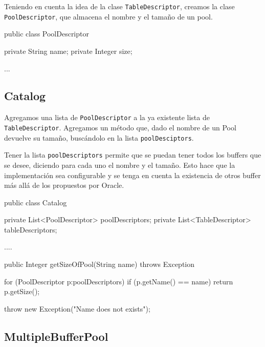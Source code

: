 Teniendo en cuenta la idea de la clase \texttt{TableDescriptor},
creamos la clase \texttt{PoolDescriptor}, que almacena el 
nombre y el tamaño de un pool.

\vspace*{-0.2cm}
\begin{verbatimtab}[4]
public class PoolDescriptor
{
	private String name;
	private Integer size;

	...
}
\end{verbatimtab}


\newpage

\subsection{Catalog}

Agregamos una lista de \texttt{PoolDescriptor} a la ya existente lista 
de \texttt{TableDescriptor}.
Agregamos un método que, dado el nombre de un Pool devuelve su tamaño, 
buscándolo en la lista \texttt{poolDesciptors}.

\vspace*{0.5cm}

Tener la lista \texttt{poolDescriptors} permite que se puedan tener
todos los buffers que se desee, diciendo para cada uno el nombre y 
el tamaño. Esto hace que la implementación sea configurable y
se tenga en cuenta la existencia de otros buffer más allá de los
propuestos por Oracle.

\begin{verbatimtab}[4]
public class Catalog
{
	private List<PoolDescriptor> poolDescriptors;
	private List<TableDescriptor> tableDescriptors;	

	....

	public Integer getSizeOfPool(String name) throws Exception 
	{
		for (PoolDescriptor p:poolDescriptors)
		{
			if (p.getName() == name)
			{
				return p.getSize();
			}
		}
		
		throw new Exception("Name does not exists");
	}
}
\end{verbatimtab}


\subsection{MultipleBufferPool}

